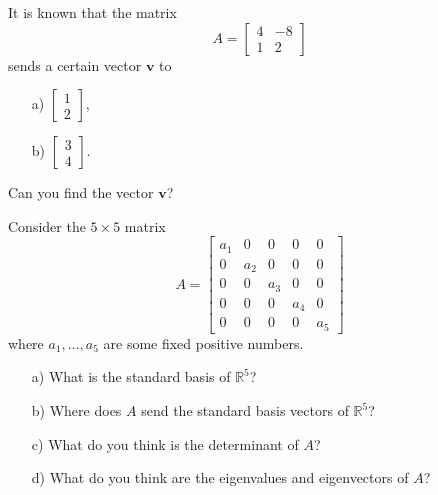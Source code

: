 \medskip 

\begin{problem}
    It is known that the matrix 
    \[
    A=\begin{bmatrix}
        4 & -8 \\ 1 & 2
    \end{bmatrix}
    \]
    sends a certain vector $\mathbf{v}$ to
\begin{enumerate}
    \item[a) ] $\begin{bmatrix}
        1 \\2
    \end{bmatrix}$,
    \item[b) ] $\begin{bmatrix}
        3 \\ 4
    \end{bmatrix}$.
\end{enumerate}
Can you find the vector $\mathbf{v}$?


\end{problem}



\medskip 

\begin{problem}
    Consider the $5 \times 5$ matrix 
    \[
    A=\begin{bmatrix}
        a_1 & 0 & 0 & 0 & 0 \\
        0 & a_2 & 0 & 0 & 0 \\
        0 & 0 & a_3 & 0 & 0 \\
        0 & 0 & 0 & a_4 & 0 \\
        0 & 0 & 0 & 0 & a_5 
    \end{bmatrix}
    \]
    where $a_1, \dots, a_5$ are some fixed positive numbers. 
    \begin{enumerate}
        \item[a) ] What is the standard basis of $\mathbb{R}^5$?
        
        \item[b) ] Where does $A$ send the standard basis vectors of $\mathbb{R}^5$?

        \item[c) ] What do you think is the determinant of $A$?
        
        \item[d) ] What do you think are the eigenvalues and eigenvectors of $A$?
    \end{enumerate}


\end{problem}





        
        